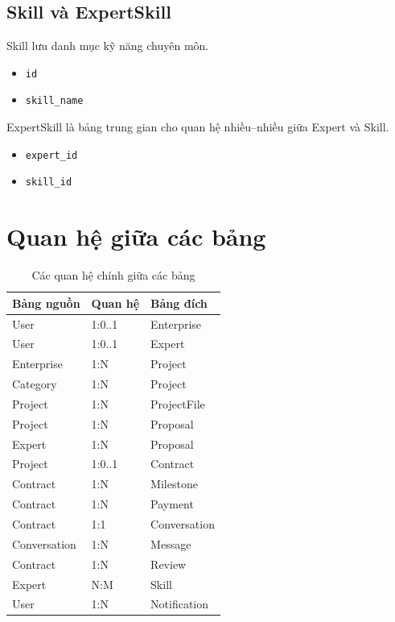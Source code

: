 \subsection{Skill và ExpertSkill}

Skill lưu danh mục kỹ năng chuyên môn.

\begin{itemize}
    \item \texttt{id}
    \item \texttt{skill\_name}
\end{itemize}

ExpertSkill là bảng trung gian cho quan hệ nhiều--nhiều giữa Expert và Skill.

\begin{itemize}
    \item \texttt{expert\_id}
    \item \texttt{skill\_id}
\end{itemize}

\section{Quan hệ giữa các bảng}
\label{sec:table-relationships}

\begin{table}[H]
    \centering
    \caption{Các quan hệ chính giữa các bảng}
    \label{tab:table-relationships}
    \begin{tabular}{|p{4.1cm}|p{2.8cm}|p{6.8cm}|}
        \hline
        \textbf{Bảng nguồn} & \textbf{Quan hệ} & \textbf{Bảng đích} \\ \hline
        User & 1:0..1 & Enterprise \\ \hline
        User & 1:0..1 & Expert \\ \hline
        Enterprise & 1:N & Project \\ \hline
        Category & 1:N & Project \\ \hline
        Project & 1:N & ProjectFile \\ \hline
        Project & 1:N & Proposal \\ \hline
        Expert & 1:N & Proposal \\ \hline
        Project & 1:0..1 & Contract \\ \hline
        Contract & 1:N & Milestone \\ \hline
        Contract & 1:N & Payment \\ \hline
        Contract & 1:1 & Conversation \\ \hline
        Conversation & 1:N & Message \\ \hline
        Contract & 1:N & Review \\ \hline
        Expert & N:M & Skill \\ \hline
        User & 1:N & Notification \\ \hline
    \end{tabular}
\end{table}

